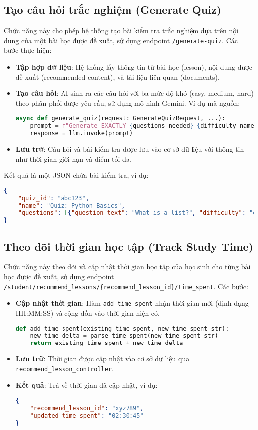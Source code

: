 \subsection{Tạo câu hỏi trắc nghiệm (Generate Quiz)}
Chức năng này cho phép hệ thống tạo bài kiểm tra trắc nghiệm dựa trên nội dung của một bài học được đề xuất, sử dụng endpoint \texttt{/generate-quiz}. Các bước thực hiện:
\begin{itemize}
    \item \textbf{Tập hợp dữ liệu}: Hệ thống lấy thông tin từ bài học (lesson), nội dung được đề xuất (recommended content), và tài liệu liên quan (documents).
    \item \textbf{Tạo câu hỏi}: AI sinh ra các câu hỏi với ba mức độ khó (easy, medium, hard) theo phân phối được yêu cầu, sử dụng mô hình Gemini. Ví dụ mã nguồn:
    \begin{lstlisting}[language=Python]
async def generate_quiz(request: GenerateQuizRequest, ...):
    prompt = f"Generate EXACTLY {questions_needed} {difficulty_name} difficulty questions..."
    response = llm.invoke(prompt)
    \end{lstlisting}
    \item \textbf{Lưu trữ}: Câu hỏi và bài kiểm tra được lưu vào cơ sở dữ liệu với thông tin như thời gian giới hạn và điểm tối đa.
\end{itemize}
Kết quả là một JSON chứa bài kiểm tra, ví dụ:
\begin{lstlisting}[language=JSON]
{
    "quiz_id": "abc123",
    "name": "Quiz: Python Basics",
    "questions": [{"question_text": "What is a list?", "difficulty": "easy", "points": 5, ...}]
}
\end{lstlisting}

\subsection{Theo dõi thời gian học tập (Track Study Time)}
Chức năng này theo dõi và cập nhật thời gian học tập của học sinh cho từng bài học được đề xuất, sử dụng endpoint \texttt{/student/recommend\_lessons/\{recommend\_lesson\_id\}/time\_spent}. Các bước:
\begin{itemize}
    \item \textbf{Cập nhật thời gian}: Hàm \texttt{add\_time\_spent} nhận thời gian mới (định dạng HH:MM:SS) và cộng dồn vào thời gian hiện có.
    \begin{lstlisting}[language=Python]
def add_time_spent(existing_time_spent, new_time_spent_str):
    new_time_delta = parse_time_spent(new_time_spent_str)
    return existing_time_spent + new_time_delta
    \end{lstlisting}
    \item \textbf{Lưu trữ}: Thời gian được cập nhật vào cơ sở dữ liệu qua \texttt{recommend\_lesson\_controller}.
    \item \textbf{Kết quả}: Trả về thời gian đã cập nhật, ví dụ:
    \begin{lstlisting}[language=JSON]
{
    "recommend_lesson_id": "xyz789",
    "updated_time_spent": "02:30:45"
}
\end{lstlisting}
\end{itemize}

